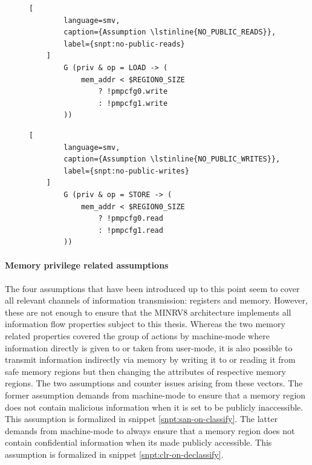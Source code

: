 \begin{figure}
    \begin{lstlisting}[
        language=smv,
        caption={Assumption \lstinline{NO_PUBLIC_READS}},
        label={snpt:no-public-reads}
    ]
        G (priv & op = LOAD -> (
            mem_addr < $REGION0_SIZE
                ? !pmpcfg0.write
                : !pmpcfg1.write
        ))
    \end{lstlisting}

    \begin{lstlisting}[
        language=smv,
        caption={Assumption \lstinline{NO_PUBLIC_WRITES}},
        label={snpt:no-public-writes}
    ]
        G (priv & op = STORE -> (
            mem_addr < $REGION0_SIZE
                ? !pmpcfg0.read
                : !pmpcfg1.read
        ))
    \end{lstlisting}
\end{figure}

\paragraph{Memory privilege related assumptions}
The four assumptions that have been introduced up to this point seem to cover all relevant channels of information transmission: registers and memory.
However, these are not enough to ensure that the MINRV8 architecture implements all information flow properties subject to this thesis.
Whereas the two memory related properties covered the group of actions by machine-mode where information directly is given to or taken from user-mode, it is also possible to transmit information indirectly via memory by writing it to or reading it from safe memory regions but then changing the attributes of respective memory regions.
The two assumptions  and  counter issues arising from these vectors.
The former assumption demands from machine-mode to ensure that a memory region does not contain malicious information when it is set to be publicly inaccessible.
This assumption is formalized in snippet \ref{snpt:san-on-classify}.
The latter demands from machine-mode to always ensure that a memory region does not contain confidential information when its made publicly accessible.
This assumption is formalized in snippet \ref{snpt:clr-on-declassify}.

